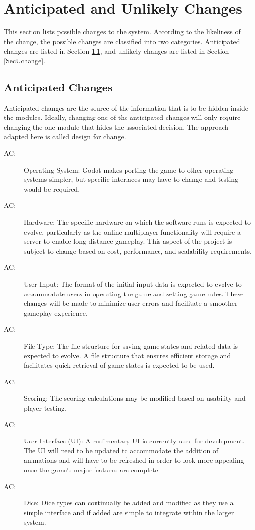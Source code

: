 \documentclass[12pt, titlepage]{article}
\newcounter{acnum}
\newcommand{\actheacnum}{AC\theacnum}
\begin{document}
\section{Anticipated and Unlikely Changes} \label{SecChange}

This section lists possible changes to the system. According to the likeliness
of the change, the possible changes are classified into two
categories. Anticipated changes are listed in Section \ref{SecAchange}, and
unlikely changes are listed in Section \ref{SecUchange}.

\subsection{Anticipated Changes} \label{SecAchange}

Anticipated changes are the source of the information that is to be hidden
inside the modules. Ideally, changing one of the anticipated changes will only
require changing the one module that hides the associated decision. The approach
adapted here is called design for
change.

\begin{description}
\item[ \actheacnum \label{acOS}:] Operating System: Godot makes porting the game to other operating systems simpler, but specific interfaces may have to change and testing would be required.
\item[ \actheacnum \label{acHardware}:] Hardware: The specific hardware on which the software runs is expected to evolve, particularly as the online multiplayer functionality will require a server to enable long-distance gameplay. This aspect of the project is subject to change based on cost, performance, and scalability requirements.
\item[ \actheacnum \label{acUserInput}:] User Input: The format of the initial input data is expected to evolve to accommodate users in operating the game and setting game rules. These changes will be made to minimize user errors and facilitate a smoother gameplay experience.
\item[ \actheacnum \label{acFileType}:] File Type: The file structure for saving game states and related data is expected to evolve. A file structure that ensures efficient storage and facilitates quick retrieval of game states is expected to be used. 
\item[ \actheacnum \label{acScoring}:] Scoring: The scoring calculations may be modified based on usability and player testing.
\item[ \actheacnum \label{acUI}:] User Interface (UI): A rudimentary UI is currently used for development. The UI will need to be updated to accommodate the addition of animations and will have to be refreshed in order to look more appealing once the game's major features are complete.
\item[ \actheacnum \label{acDice}:] Dice: Dice types can continually be added and modified as they use a simple interface and if added are simple to integrate within the larger system.
\end{description}
\end{document}
